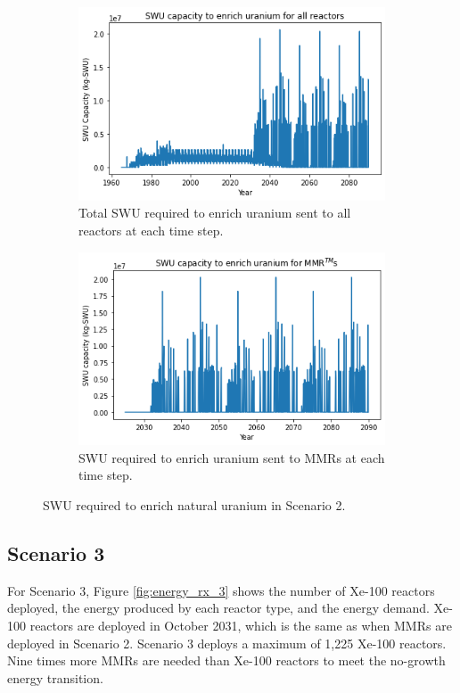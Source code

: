 \begin{figure}
    \centering
    \begin{subfigure}{0.45\textwidth}
        \centering
        \includegraphics[scale=0.4]{../figures/totalswu_scenarios_2.png}
        \caption{Total \gls{SWU} required to enrich uranium sent to all reactors at each time step.}
        \label{fig:totalswu_2}
    \end{subfigure}
    \hspace{0.8cm}
    \begin{subfigure}{0.45\textwidth}
        \centering
        \includegraphics[scale=0.4]{../figures/haleuSWU_scenarios_2.png}
        \caption{\gls{SWU} required to enrich uranium sent to \glspl{MMR} at each time step.}
        \label{fig:haleuswu_2}
    \end{subfigure}
    \caption{\gls{SWU} required to enrich natural uranium in Scenario 2.}
    \label{fig:swu_2}
\end{figure}

\subsection{Scenario 3}
For Scenario 3, Figure \ref{fig:energy_rx_3} shows the number of Xe-100 reactors deployed, 
the energy produced by each reactor type, and the energy demand. 
Xe-100 reactors are deployed in October 2031, which is the same as when 
\glspl{MMR}
are deployed in Scenario 2. Scenario 3 deploys a maximum of 1,225 Xe-100 
reactors. Nine times more \glspl{MMR} are needed than Xe-100 reactors to 
meet the no-growth energy transition.

